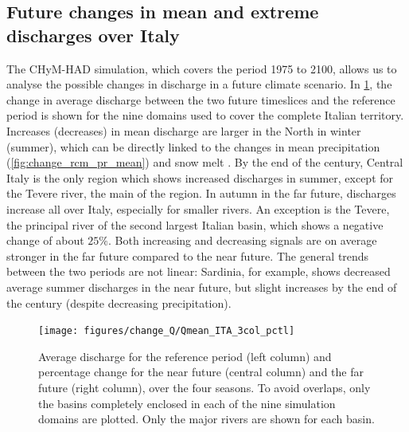 \subsection{Future changes in mean and extreme discharges over Italy}
The CHyM-HAD simulation, which covers the period 1975 to 2100, allows us to analyse the possible changes in discharge in a future climate scenario.
In \cref{fig:change_qmean_hadgem}, the change in average discharge between the two future timeslices and the reference period is shown for the nine domains used to cover the complete Italian territory.
Increases (decreases) in mean discharge are larger in the North in winter (summer), which can be directly linked to the changes in mean precipitation (\cref{fig:change_rcm_pr_mean}) and snow melt \citep{coppola2014ChahydconPobasundglowar}.
By the end of the century, Central Italy is the only region which shows increased discharges in summer, except for the Tevere river, the main of the region.
In autumn in the far future, discharges increase all over Italy, especially for smaller rivers.
An exception is the Tevere, the principal river of the second largest Italian basin, which shows a negative change of about $25\%$. 
Both increasing and decreasing signals are on average stronger in the far future compared to the near future.
The general trends between the two periods are not linear: Sardinia, for example, shows decreased average summer discharges in the near future, but slight increases by the end of the century (despite decreasing precipitation).
\begin{figure}
    \centering
    \texttt{[image: figures/change\_Q/Qmean\_ITA\_3col\_pctl]}
    \decoRule
    \caption[Average discharge change in CHyM (HadGEM)]{
        Average discharge for the reference period (left column) and percentage change for the near future (central column) and the far future (right column), over the four seasons. To avoid overlaps, only the basins completely enclosed in each of the nine simulation domains are plotted. Only the major rivers are shown for each basin.
    } \label{fig:change_qmean_hadgem}
\end{figure}

